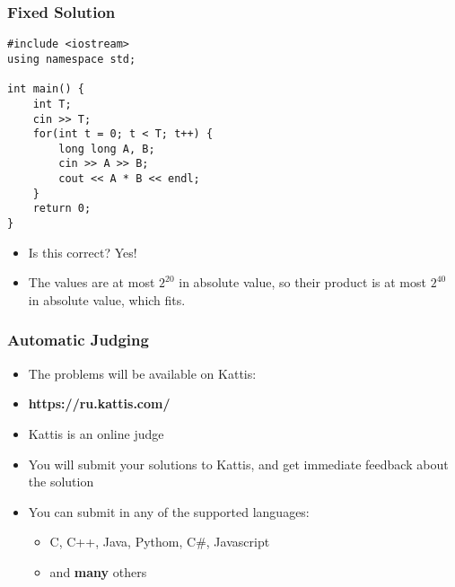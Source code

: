 \documentclass{beamer}
\begin{document}
\begin{frame}
    \frametitle{Fixed Solution}
	\begin{scriptsize}
        \begin{verbatim}
#include <iostream>
using namespace std;

int main() {
    int T;
    cin >> T;
    for(int t = 0; t < T; t++) {
        long long A, B;
        cin >> A >> B;
        cout << A * B << endl;
    }
    return 0;
}
        \end{verbatim}
    \end{scriptsize}
    \begin{itemize}
       \item<2-> Is this correct?  {\alert{Yes!}}
       \item<3-> The values are at most $2^{20}$ in absolute value, so their product is at most $2^{40}$ in absolute value, which fits. 
    \end{itemize}
\end{frame}

\begin{frame}[plain]
    \frametitle{Automatic Judging}
    \begin{itemize}
        \item The problems will be available on \alert{Kattis}:
        \item \textbf{https://ru.kattis.com/}
        \vspace{20pt}
        \item Kattis is an online judge
        \item You will submit your solutions to Kattis, and get immediate feedback about the solution
        \item You can submit in any of the supported languages:
        \begin{itemize}
            \item C, C++, Java, Pythom, C\#{}, Javascript
            \item and \textbf{many} others
        \end{itemize}
    \end{itemize}
\end{frame}
\end{document}
